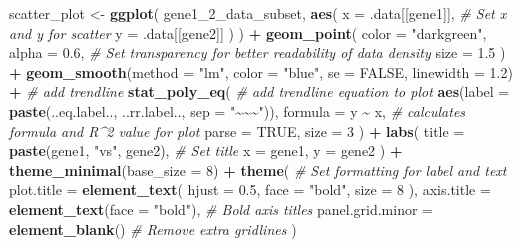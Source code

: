 \documentclass[
]{article}
\newenvironment{Shaded}{\begin{snugshade}}{\end{snugshade}}
\newcommand{\AttributeTok}[1]{\textcolor[rgb]{0.13,0.29,0.53}{#1}}
\newcommand{\CommentTok}[1]{\textcolor[rgb]{0.56,0.35,0.01}{\textit{#1}}}
\newcommand{\ConstantTok}[1]{\textcolor[rgb]{0.56,0.35,0.01}{#1}}
\newcommand{\DecValTok}[1]{\textcolor[rgb]{0.00,0.00,0.81}{#1}}
\newcommand{\FloatTok}[1]{\textcolor[rgb]{0.00,0.00,0.81}{#1}}
\newcommand{\FunctionTok}[1]{\textcolor[rgb]{0.13,0.29,0.53}{\textbf{#1}}}
\newcommand{\NormalTok}[1]{#1}
\newcommand{\OtherTok}[1]{\textcolor[rgb]{0.56,0.35,0.01}{#1}}
\newcommand{\SpecialCharTok}[1]{\textcolor[rgb]{0.81,0.36,0.00}{\textbf{#1}}}
\newcommand{\StringTok}[1]{\textcolor[rgb]{0.31,0.60,0.02}{#1}}
\begin{document}
\begin{Shaded}
\begin{Highlighting}[]
\NormalTok{  scatter\_plot }\OtherTok{\textless{}{-}} \FunctionTok{ggplot}\NormalTok{(}
\NormalTok{    gene1\_2\_data\_subset,}
      \FunctionTok{aes}\NormalTok{(}
        \AttributeTok{x =}\NormalTok{ .data[[gene1]], }\CommentTok{\# Set x and y for scatter }
        \AttributeTok{y =}\NormalTok{ .data[[gene2]]}
\NormalTok{      )}
\NormalTok{  ) }\SpecialCharTok{+}
    \FunctionTok{geom\_point}\NormalTok{(}
      \AttributeTok{color =} \StringTok{"darkgreen"}\NormalTok{,}
      \AttributeTok{alpha =} \FloatTok{0.6}\NormalTok{, }\CommentTok{\# Set transparency for better readability of data density}
      \AttributeTok{size =} \FloatTok{1.5}
\NormalTok{  ) }\SpecialCharTok{+}
  \FunctionTok{geom\_smooth}\NormalTok{(}\AttributeTok{method =} \StringTok{"lm"}\NormalTok{, }\AttributeTok{color =} \StringTok{"blue"}\NormalTok{, }\AttributeTok{se =} \ConstantTok{FALSE}\NormalTok{, }\AttributeTok{linewidth =} \FloatTok{1.2}\NormalTok{) }\SpecialCharTok{+} \CommentTok{\# add trendline}
  \FunctionTok{stat\_poly\_eq}\NormalTok{( }\CommentTok{\# add trendline equation to plot }
    \FunctionTok{aes}\NormalTok{(}\AttributeTok{label =} \FunctionTok{paste}\NormalTok{(..eq.label.., ..rr.label.., }\AttributeTok{sep =} \StringTok{"\textasciitilde{}\textasciitilde{}\textasciitilde{}"}\NormalTok{)), }
    \AttributeTok{formula =}\NormalTok{ y }\SpecialCharTok{\textasciitilde{}}\NormalTok{ x, }\CommentTok{\# calculates formula and R\^{}2 value for plot}
    \AttributeTok{parse =} \ConstantTok{TRUE}\NormalTok{,}
    \AttributeTok{size =} \DecValTok{3}
\NormalTok{  ) }\SpecialCharTok{+}
    \FunctionTok{labs}\NormalTok{(}
      \AttributeTok{title =} \FunctionTok{paste}\NormalTok{(gene1, }\StringTok{"vs"}\NormalTok{, gene2), }\CommentTok{\# Set title}
        \AttributeTok{x =}\NormalTok{ gene1,}
        \AttributeTok{y =}\NormalTok{ gene2}
\NormalTok{  ) }\SpecialCharTok{+}
  \FunctionTok{theme\_minimal}\NormalTok{(}\AttributeTok{base\_size =} \DecValTok{8}\NormalTok{) }\SpecialCharTok{+}
  \FunctionTok{theme}\NormalTok{( }\CommentTok{\# Set formatting for label and text}
    \AttributeTok{plot.title =} \FunctionTok{element\_text}\NormalTok{(}
      \AttributeTok{hjust =} \FloatTok{0.5}\NormalTok{,}
      \AttributeTok{face =} \StringTok{"bold"}\NormalTok{,}
      \AttributeTok{size =} \DecValTok{8}
\NormalTok{    ),}
    \AttributeTok{axis.title =} \FunctionTok{element\_text}\NormalTok{(}\AttributeTok{face =} \StringTok{"bold"}\NormalTok{), }\CommentTok{\# Bold axis titles}
    \AttributeTok{panel.grid.minor =} \FunctionTok{element\_blank}\NormalTok{() }\CommentTok{\# Remove extra gridlines}
\NormalTok{  )}
  

\end{Highlighting}
\end{Shaded}
\end{document}
